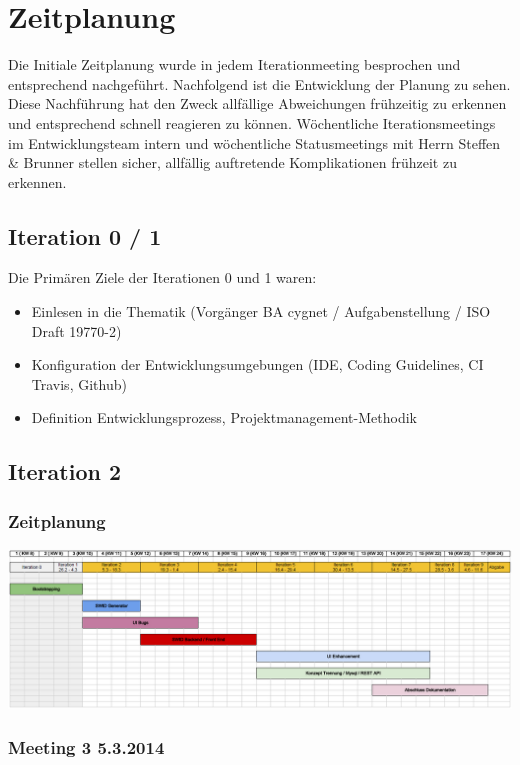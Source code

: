 \chapter{Zeitplanung}
Die Initiale Zeitplanung wurde in jedem Iterationmeeting besprochen und entsprechend nachgeführt. Nachfolgend ist die Entwicklung der Planung zu sehen. Diese Nachführung hat den Zweck allfällige Abweichungen frühzeitig zu erkennen und entsprechend schnell reagieren zu können. Wöchentliche Iterationsmeetings im Entwicklungsteam intern und wöchentliche Statusmeetings mit Herrn Steffen \& Brunner stellen sicher, allfällig auftretende Komplikationen frühzeit zu erkennen.


\section{Iteration 0 / 1}
Die Primären Ziele der Iterationen 0 und 1 waren:
\begin{itemize}
\item Einlesen in die Thematik (Vorgänger BA cygnet / Aufgabenstellung / ISO Draft 19770-2)
\item Konfiguration der Entwicklungsumgebungen (IDE, Coding Guidelines, CI Travis, Github)
\item Definition Entwicklungsprozess, Projektmanagement-Methodik
\end{itemize}

\section{Iteration 2}
\subsection{Zeitplanung}
\includegraphics[width=\textwidth]{images/zeitplanung/Iteration1_2.jpg}
\subsection{Meeting 3 5.3.2014}
